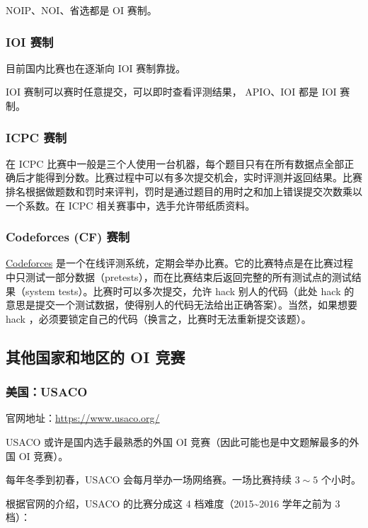 NOIP、NOI、省选都是 OI 赛制。

\subsubsection{IOI 赛制}

目前国内比赛也在逐渐向 IOI 赛制靠拢。

IOI 赛制可以赛时任意提交，可以即时查看评测结果， APIO、IOI 都是 IOI 赛制。

\subsubsection{ICPC 赛制}

在 ICPC 比赛中一般是三个人使用一台机器，每个题目只有在所有数据点全部正确后才能得到分数。比赛过程中可以有多次提交机会，实时评测并返回结果。比赛排名根据做题数和罚时来评判，罚时是通过题目的用时之和加上错误提交次数乘以一个系数。在 ICPC 相关赛事中，选手允许带纸质资料。

\subsubsection{Codeforces (CF) 赛制}

\href{https://codeforces.com}{Codeforces} 是一个在线评测系统，定期会举办比赛。它的比赛特点是在比赛过程中只测试一部分数据（pretests），而在比赛结束后返回完整的所有测试点的测试结果（system tests）。比赛时可以多次提交，允许 hack 别人的代码（此处 hack 的意思是提交一个测试数据，使得别人的代码无法给出正确答案）。当然，如果想要 hack ，必须要锁定自己的代码（换言之，比赛时无法重新提交该题）。

\subsection{其他国家和地区的 OI 竞赛}

\subsubsection{美国：USACO}

官网地址：\url{https://www.usaco.org/}

USACO 或许是国内选手最熟悉的外国 OI 竞赛（因此可能也是中文题解最多的外国 OI 竞赛）。  

每年冬季到初春，USACO 会每月举办一场网络赛。一场比赛持续 $3\sim5$ 个小时。  

根据官网的介绍，USACO 的比赛分成这 4 档难度（2015\textasciitilde{}2016 学年之前为 3 档）：

